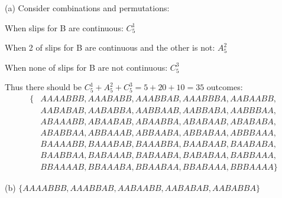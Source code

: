 \solution
(a) Consider combinations and permutations:\par
When slips for B are continuous: $C_{5}^{1}$\par
When 2 of slips for B are continuous and the other is not: $A_{5}^{2}$\par
When none of slips for B are not continuous: $C_{5}^{3}$\par
Thus there should be $C_{5}^{1}+A_{5}^{2}+C_{5}^{3} = 5+20+10 = 35$ outcomes:
\begin{equation*}
    \begin{split}
      \{& AAAABBB, AAABABB, AAABBAB, AAABBBA, AABAABB,\\
        & AABABAB, AABABBA, AABBAAB, AABBABA, AABBBAA,\\
        & ABAAABB, ABAABAB, ABAABBA, ABABAAB, ABABABA,\\
        & ABABBAA, ABBAAAB, ABBAABA, ABBABAA, ABBBAAA,\\
        & BAAAABB, BAAABAB, BAAABBA, BAABAAB, BAABABA,\\
        & BAABBAA, BABAAAB, BABAABA, BABABAA, BABBAAA,\\
        & BBAAAAB, BBAAABA, BBAABAA, BBABAAA, BBBAAAA\}
    \end{split}
\end{equation*}\par

(b)
$\{AAAABBB, AAABBAB, AABAABB, AABABAB, AABABBA\}$